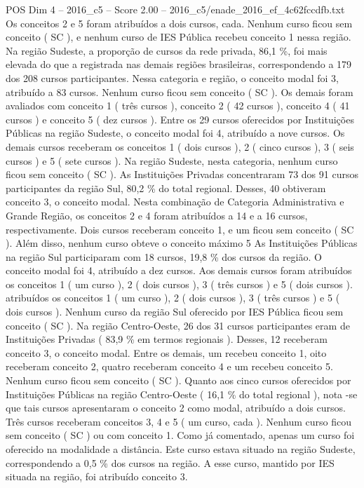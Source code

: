 \begin{textsample}{POS Dim 4 – 2016\_c5 – Score 2.00 – 2016\_c5/enade\_2016\_ef\_4c62fccdfb.txt}
Os conceitos 2 e 5 foram atribuídos a dois cursos, cada.
Nenhum curso ficou sem conceito ( SC ), e nenhum curso de IES Pública recebeu conceito 1 nessa região.
Na região Sudeste, a proporção de cursos da rede privada, 86,1 \%, foi mais elevada do que a registrada nas demais regiões brasileiras, correspondendo a 179 dos 208 cursos participantes.
Nessa categoria e região, o conceito modal foi 3, atribuído a 83 cursos.
Nenhum curso ficou sem conceito ( SC ).
Os demais foram avaliados com conceito 1 ( três cursos ), conceito 2 ( 42 cursos ), conceito 4 ( 41 cursos ) e conceito 5 ( dez cursos ).
Entre os 29 cursos oferecidos por Instituições Públicas na região Sudeste, o conceito modal foi 4, atribuído a nove cursos.
Os demais cursos receberam os conceitos 1 ( dois cursos ), 2 ( cinco cursos ), 3 ( seis cursos ) e 5 ( sete cursos ).
Na região Sudeste, nesta categoria, nenhum curso ficou sem conceito ( SC ).
As Instituições Privadas concentraram 73 dos 91 cursos participantes da região Sul, 80,2 \% do total regional.
Desses, 40 obtiveram conceito 3, o conceito modal.
Nesta combinação de Categoria Administrativa e Grande Região, os conceitos 2 e 4 foram atribuídos a 14 e a 16 cursos, respectivamente.
Dois cursos receberam conceito 1, e um ficou sem conceito ( SC ).
Além disso, nenhum curso obteve o conceito máximo 5 As Instituições Públicas na região Sul participaram com 18 cursos, 19,8 \% dos cursos da região.
O conceito modal foi 4, atribuído a dez cursos.
Aos demais cursos foram atribuídos os conceitos 1 ( um curso ), 2 ( dois cursos ), 3 ( três cursos ) e 5 ( dois cursos ). atribuídos os conceitos 1 ( um curso ), 2 ( dois cursos ), 3 ( três cursos ) e 5 ( dois cursos ).
Nenhum curso da região Sul oferecido por IES Pública ficou sem conceito ( SC ).
Na região Centro-Oeste, 26 dos 31 cursos participantes eram de Instituições Privadas ( 83,9 \% em termos regionais ).
Desses, 12 receberam conceito 3, o conceito modal.
Entre os demais, um recebeu conceito 1, oito receberam conceito 2, quatro receberam conceito 4 e um recebeu conceito 5.
Nenhum curso ficou sem conceito ( SC ).
Quanto aos cinco cursos oferecidos por Instituições Públicas na região Centro-Oeste ( 16,1 \% do total regional ), nota -se que tais cursos apresentaram o conceito 2 como modal, atribuído a dois cursos.
Três cursos receberam conceitos 3, 4 e 5 ( um curso, cada ).
Nenhum curso ficou sem conceito ( SC ) ou com conceito 1.
Como já comentado, apenas um curso foi oferecido na modalidade a distância.
Este curso estava situado na região Sudeste, correspondendo a 0,5 \% dos cursos na região.
A esse curso, mantido por IES situada na região, foi atribuído conceito 3.

\end{textsample}
